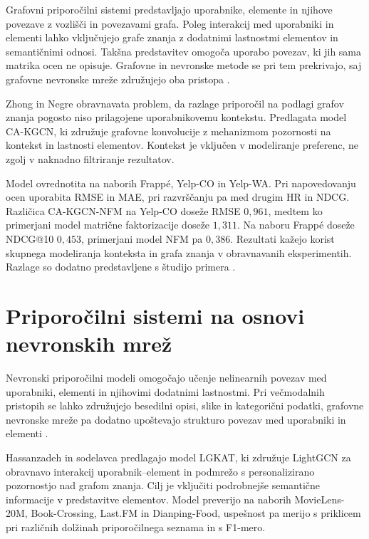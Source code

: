 \documentclass[a4paper,twoside,openright,12pt,slovene]{book}
\begin{document}
Grafovni priporočilni sistemi predstavljajo uporabnike,
elemente in njihove povezave z vozlišči in povezavami grafa.
Poleg interakcij med uporabniki in elementi lahko vključujejo
grafe znanja z dodatnimi lastnostmi elementov in semantičnimi
odnosi. Takšna predstavitev omogoča uporabo povezav, ki jih
sama matrika ocen ne opisuje. Grafovne in nevronske metode
se pri tem prekrivajo, saj grafovne nevronske mreže
združujejo oba pristopa \cite{zhong2023context}.

Zhong in Negre \cite{zhong2023context} obravnavata problem,
da razlage priporočil na podlagi grafov znanja pogosto
niso prilagojene uporabnikovemu kontekstu. Predlagata
model CA-KGCN, ki združuje grafovne konvolucije z
mehanizmom pozornosti na kontekst in lastnosti elementov.
Kontekst je vključen v modeliranje preferenc, ne zgolj
v naknadno filtriranje rezultatov.

Model ovrednotita na naborih Frappé, Yelp-CO in Yelp-WA.
Pri napovedovanju ocen uporabita RMSE in MAE, pri
razvrščanju pa med drugim HR in NDCG.
Različica CA-KGCN-NFM na Yelp-CO doseže RMSE
$0{,}961$, medtem ko primerjani model matrične
faktorizacije doseže $1{,}311$.
Na naboru Frappé doseže NDCG@10 $0{,}453$,
primerjani model NFM pa $0{,}386$.
Rezultati kažejo korist skupnega modeliranja konteksta
in grafa znanja v obravnavanih eksperimentih.
Razlage so dodatno predstavljene s študijo primera
\cite{zhong2023context}.


\section{Priporočilni sistemi na osnovi nevronskih mrež}
\label{sec:sota_neural}

Nevronski priporočilni modeli omogočajo učenje nelinearnih
povezav med uporabniki, elementi in njihovimi dodatnimi
lastnostmi. Pri večmodalnih pristopih se lahko združujejo
besedilni opisi, slike in kategorični podatki, grafovne
nevronske mreže pa dodatno upoštevajo strukturo povezav
med uporabniki in elementi
\cite{hassanzadeh2025lgkat,jiao2025multitask}.

Hassanzadeh in sodelavca \cite{hassanzadeh2025lgkat}
predlagajo model LGKAT, ki združuje LightGCN za
obravnavo interakcij uporabnik--element in podmrežo
s personalizirano pozornostjo nad grafom znanja.
Cilj je vključiti podrobnejše semantične informacije
v predstavitve elementov. Model preverijo na naborih
MovieLens-20M, Book-Crossing, Last.FM in Dianping-Food,
uspešnost pa merijo s priklicem pri različnih dolžinah
priporočilnega seznama in s F1-mero.
\end{document}
